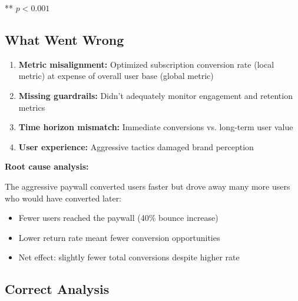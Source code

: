 ** $p < 0.001$

\subsection{What Went Wrong}

\begin{enumerate}
    \item \textbf{Metric misalignment:} Optimized subscription conversion rate (local metric) at expense of overall user base (global metric)

    \item \textbf{Missing guardrails:} Didn't adequately monitor engagement and retention metrics

    \item \textbf{Time horizon mismatch:} Immediate conversions vs. long-term user value

    \item \textbf{User experience:} Aggressive tactics damaged brand perception
\end{enumerate}

\textbf{Root cause analysis:}

The aggressive paywall converted users faster but drove away many more users who would have converted later:
\begin{itemize}
    \item Fewer users reached the paywall (40\% bounce increase)
    \item Lower return rate meant fewer conversion opportunities
    \item Net effect: slightly fewer total conversions despite higher rate
\end{itemize}

\subsection{Correct Analysis}

